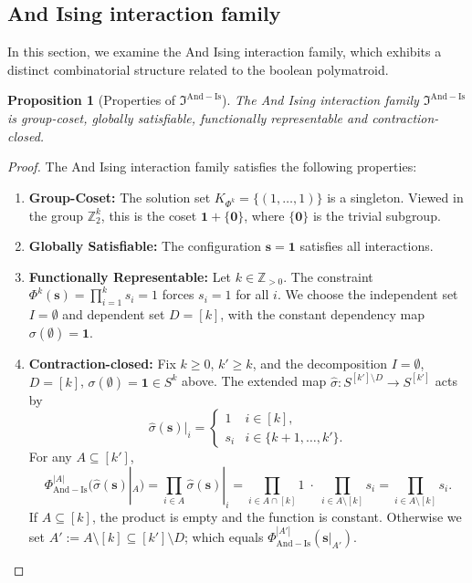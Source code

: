\documentclass[11pt,reqno]{amsart}
\newcommand{\vecs}{\boldsymbol{s}}
\newcommand{\veco}{\boldsymbol{0}}
\newcommand{\vecone}{\boldsymbol{1}}
\newcommand{\mca}{\mathfrak{I}^{\mathrm{And-Is}}}
\theoremstyle{plain}
\newtheorem{proposition}[theorem]{Proposition}
\theoremstyle{definition}
\numberwithin{equation}{section}
\begin{document}
\subsection{And Ising interaction family}
\label{sec:AndIsing}

In this section, we examine the And Ising interaction family, which exhibits a distinct combinatorial structure related to the boolean polymatroid.

\begin{proposition}[Properties of $\mca$]
    The And Ising interaction family $\mca$ is group-coset, globally satisfiable, functionally representable and contraction-closed.
\end{proposition}
\begin{proof}
    The And Ising interaction family satisfies the following properties:
    \begin{enumerate}
        \item \textbf{Group-Coset:} The solution set $K_{\Phi^k} = \{ (1, \dots, 1) \}$ is a singleton. Viewed in the group $\mathbb{Z}_2^k$, this is the coset $\vecone + \{\veco\}$, where $\{\veco\}$ is the trivial subgroup.
        \item \textbf{Globally Satisfiable:} The configuration $\vecs = \vecone$ satisfies all interactions.
        \item \textbf{Functionally Representable:} Let $k \in \mathbb{Z}_{>0}$. The constraint $\Phi^k(\vecs) = \prod_{i=1}^k s_i = 1$ forces $s_i = 1$ for all $i$. We choose the independent set $I = \emptyset$ and dependent set $D = [k]$, with the constant dependency map $\sigma(\emptyset) = \vecone$.
        \item \textbf{Contraction-closed:} Fix $k \geq 0$, $k' \geq k$, and the
decomposition $I = \emptyset$, $D = [k]$, $\sigma(\emptyset) = \vecone \in
S^k$ above. The extended map $\hat\sigma \colon S^{[k'] \setminus D} \to
S^{[k']}$ acts by
\[
    \hat\sigma(\vecs)|_i =
    \begin{cases}
        1 & i \in [k], \\
        s_i & i \in \{k+1, \dots, k'\}.
    \end{cases}
\]
For any $A \subseteq [k']$,
\[
    \Phi^{|A|}_{\mathrm{And-Is}}(\hat\sigma(\vecs)|_A)
    = \prod_{i \in A} \hat\sigma(\vecs)|_i
    = \prod_{i \in A \cap [k]} 1 \;\cdot\; \prod_{i \in A \setminus [k]} s_i
    = \prod_{i \in A \setminus [k]} s_i.
\]
If $A \subseteq [k]$, the product is empty and the function is constant. Otherwise we set $A' := A \setminus [k] \subseteq [k'] \setminus D$; which equals $\Phi^{|A'|}_{\mathrm{And-Is}}(\vecs|_{A'})$. \qedhere
\end{enumerate}
\end{proof}
\end{document}
